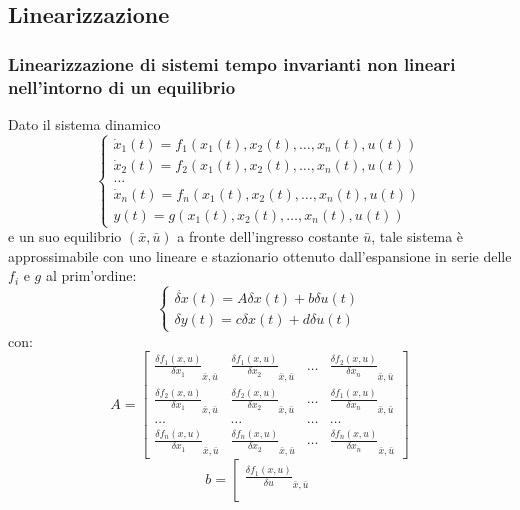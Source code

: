 \begin{landscape}
    \subsection*{Linearizzazione}
    \subsubsection*{Linearizzazione di sistemi tempo invarianti non lineari nell'intorno di un equilibrio}
    Dato il sistema dinamico 
    \[
        \begin{cases}
            \dot{x}_1(t) = f_1(x_1(t),x_2(t),\dots,x_n(t),u(t))\\
            \dot{x}_2(t) = f_2(x_1(t),x_2(t),\dots,x_n(t),u(t))\\
            \dots\\
            \dot{x}_n(t) = f_n(x_1(t),x_2(t),\dots,x_n(t),u(t))\\
            y(t) = g(x_1(t),x_2(t),\dots,x_n(t),u(t))
        \end{cases}
    \]
    e un suo equilibrio $(\bar{x}, \bar{u})$ a fronte dell'ingresso costante $\bar{u}$, tale sistema è approssimabile con uno lineare e stazionario ottenuto dall'espansione in serie delle $f_i$ e $g$ al prim'ordine:
    \[
        \begin{cases}
            \dot{\delta x} (t) = A \delta x(t) + b \delta u(t)\\
            \delta y (t) = c \delta x (t) + d \delta u (t)
        \end{cases}
    \]
    con:
    \[
        A = \left[\begin{matrix}
            \frac{\delta f_1 (x,u)}{\delta x_1}_{\bar{x}, \bar{u}} & \frac{\delta f_1 (x,u)}{\delta x_2}_{\bar{x}, \bar{u}} & \dots & \frac{\delta f_2 (x,u)}{\delta x_n}_{\bar{x}, \bar{u}}\\
            \frac{\delta f_2(x,u)}{\delta x_1}_{\bar{x}, \bar{u}} & \frac{\delta f_2(x,u)}{\delta x_2}_{\bar{x}, \bar{u}} & \dots & \frac{\delta f_1(x,u)}{\delta x_n}_{\bar{x}, \bar{u}}\\
            \dots & \dots & \dots & \dots\\
            \frac{\delta f_n(x,u)}{\delta x_1}_{\bar{x}, \bar{u}} & \frac{\delta f_n (x,u)}{\delta x_2}_{\bar{x}, \bar{u}} & \dots & \frac{\delta f_n (x,u)}{\delta x_n}_{\bar{x}, \bar{u}} 
        \end{matrix}\right]
    \]
    \[
        b = \left[\begin{matrix}
            \frac{\delta f_1 (x,u)}{\delta u}_{\bar{x}, \bar{u}}\\

\end{matrix}\]
\end{landscape}
